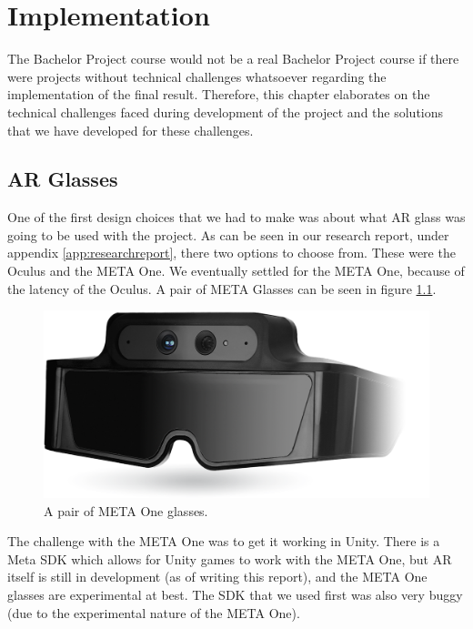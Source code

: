 \chapter{Implementation} \label{cha:implementation}
	The Bachelor Project course would not be a real Bachelor Project course if 
	there were projects without technical challenges whatsoever regarding the 
	implementation of the final result. Therefore, this chapter elaborates
	on the technical challenges faced during development of the project and
	the solutions that we have developed for these challenges.
	
	\section{AR Glasses} \label{sec:arglasses}
		One of the first design choices that we had to make was about what
		AR glass was going to be used with the project. As can be seen in
		our research report, under appendix \ref{app:researchreport},
		there two options to choose from. These were the Oculus and
		the META One. We eventually settled for the META One, because
		of the latency of the Oculus. A pair of META Glasses can be seen in
		figure \ref{fig:metaone}.
		
		\begin{figure}[!ht]
			\centering
			\includegraphics[width=\textwidth]{MetaOneGlasses}
			\caption{A pair of META One glasses.}
			\label{fig:metaone}
		\end{figure}
		
		The challenge with the META One was to get it working in Unity.
		There is a Meta SDK which allows for Unity games to work with
		the META One, but AR itself is still in development (as of
		writing this report), and the META One glasses are experimental
		at best. The SDK that we used first was also very buggy (due to the
		experimental nature of the META One).
		

